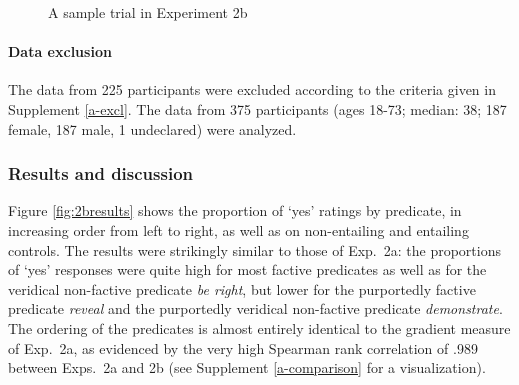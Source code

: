 \documentclass[11pt,fleqn]{article}
\newcommand{\6}{\mbox{$[\hspace*{-.6mm}[$}}
\newcommand{\9}{\mbox{$]\hspace*{-.6mm}]$}}
\begin{document}
\begin{figure}[h!]
\begin{center}
\end{center}
\caption{A sample trial in Experiment 2b}\label{fig-trial-exp2b}
\end{figure}


\paragraph{Data exclusion} The data from 225 participants were excluded according to the criteria given in Supplement \ref{a-excl}. The data from 375 participants (ages 18-73; median: 38; 187 female, 187 male, 1 undeclared) were analyzed.
    

\subsubsection{Results and discussion}

Figure \ref{fig:2bresults} shows the proportion of `yes' ratings by predicate, in increasing order from left to right, as well as on non-entailing and entailing controls. The results were strikingly similar to those of Exp.~2a: the proportions of `yes' responses were quite high for most factive predicates as well as for the veridical non-factive predicate {\em be right}, but lower for the purportedly factive predicate {\em reveal} and the purportedly veridical non-factive predicate {\em demonstrate}. The ordering of the predicates is almost entirely identical to the gradient measure of Exp.~2a, as evidenced by the very high Spearman rank correlation of .989 between Exps.~2a and 2b (see Supplement \ref{a-comparison} for a visualization). 
 
\end{document}
